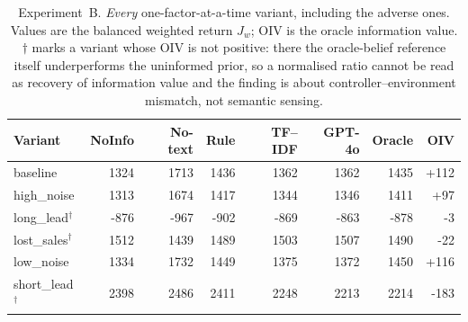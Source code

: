 \begin{table}[t]
\caption{Experiment~B. \emph{Every} one-factor-at-a-time variant, including
the adverse ones. Values are the balanced weighted return $J_w$; OIV is the
oracle information value. $\dagger$ marks a variant whose OIV is not positive:
there the oracle-belief reference itself underperforms the uninformed prior, so
a normalised ratio cannot be read as recovery of information value and the
finding is about controller--environment mismatch, not semantic sensing.}
\label{tab:boundary}
\centering\small\setlength{\tabcolsep}{4pt}
\begin{tabular}{lrrrrrrr}
\toprule
Variant & NoInfo & No-text & Rule & TF--IDF & GPT-4o & Oracle & OIV \\
\midrule
baseline & 1324 & 1713 & 1436 & 1362 & 1362 & 1435 & +112 \\
high\_noise & 1313 & 1674 & 1417 & 1344 & 1346 & 1411 & +97 \\
long\_lead$^{\dagger}$ & -876 & -967 & -902 & -869 & -863 & -878 & -3 \\
lost\_sales$^{\dagger}$ & 1512 & 1439 & 1489 & 1503 & 1507 & 1490 & -22 \\
low\_noise & 1334 & 1732 & 1449 & 1375 & 1372 & 1450 & +116 \\
short\_lead$^{\dagger}$ & 2398 & 2486 & 2411 & 2248 & 2213 & 2214 & -183 \\
\bottomrule
\end{tabular}
\end{table}
